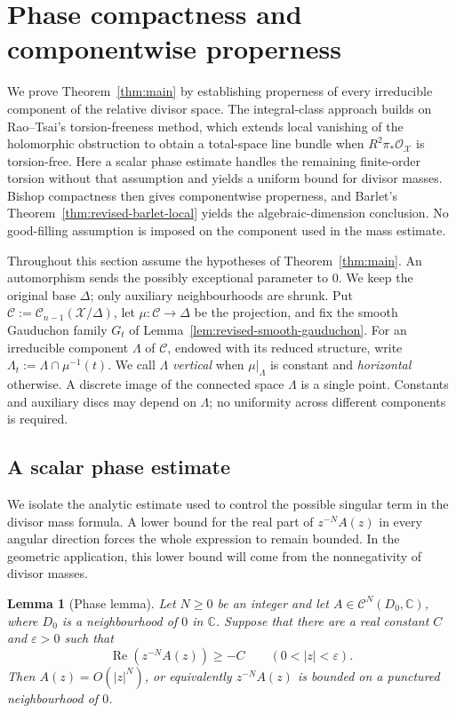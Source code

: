 \documentclass[11pt]{amsart}
\numberwithin{equation}{section}
\theoremstyle{plain}
\newtheorem{lemma}[thm]{Lemma}
\theoremstyle{definition}
\newcommand{\C}{\mathbb C}
\newcommand{\cC}{\mathcal C}
\newcommand{\cO}{\mathcal O}
\newcommand{\cX}{\mathcal X}
\begin{document}
\section{Phase compactness and componentwise properness}
\label{s:componentwise-main-proof}

We prove Theorem~\ref{thm:main} by establishing properness of every
irreducible component of the relative divisor space.  The integral-class
approach builds on Rao--Tsai's torsion-freeness method, which extends local vanishing of
the holomorphic obstruction to obtain a total-space line bundle when
$R^2\pi_*\cO_{\cX}$ is torsion-free.  Here a scalar phase estimate handles
the remaining finite-order torsion without that assumption and yields
a uniform bound for divisor masses.  Bishop compactness then gives
componentwise properness, and Barlet's Theorem~\ref{thm:revised-barlet-local}
yields the algebraic-dimension conclusion.  No good-filling assumption
is imposed on the component used in the mass estimate.

Throughout this section assume the hypotheses of Theorem~\ref{thm:main}.
An automorphism sends the possibly exceptional parameter to $0$.
We keep the original base $\Delta$; only auxiliary neighbourhoods are
shrunk.  Put $\mathscr C:=\cC_{n-1}(\cX/\Delta)$, let
$\mu:\mathscr C\to\Delta$ be the projection, and fix the smooth
Gauduchon family $G_t$ of Lemma~\ref{lem:revised-smooth-gauduchon}.
For an irreducible component $\Lambda$ of $\mathscr C$, endowed
with its reduced structure, write $\Lambda_t:=\Lambda\cap\mu^{-1}(t)$.
We call $\Lambda$
\emph{vertical} when $\mu|_\Lambda$ is constant and
\emph{horizontal} otherwise.  A discrete image of the connected space
$\Lambda$ is a single point.  Constants and auxiliary discs may depend
on $\Lambda$; no uniformity across different components is required.

\subsection{A scalar phase estimate}
\label{ss:componentwise-phase}

We isolate the analytic estimate used to control the possible singular
term in the divisor mass formula.  A lower bound for the real part of
$z^{-N}A(z)$ in every angular direction forces the whole expression to
remain bounded.  In the geometric application, this lower bound will
come from the nonnegativity of divisor masses.

\begin{lemma}[Phase lemma]\label{lem:componentwise-phase}
Let $N\ge0$ be an integer and let $A\in\mathcal C^N(D_0,\C)$,
where $D_0$ is a neighbourhood of $0$ in $\C$.  Suppose that there
are a real constant $C$ and $\varepsilon>0$ such that
\begin{equation}\label{eq:componentwise-phase-hypothesis}
 \operatorname{Re}\!\left(z^{-N}A(z)\right)\ge-C
 \qquad(0<|z|<\varepsilon).
\end{equation}
Then $A(z)=O(|z|^N)$, or equivalently $z^{-N}A(z)$ is bounded on
a punctured neighbourhood of $0$.
\end{lemma}
\end{document}

